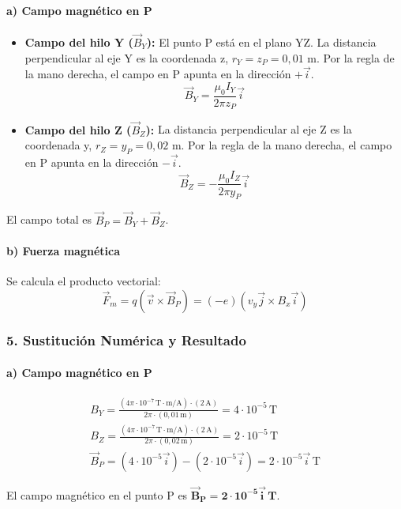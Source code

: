 \paragraph*{a) Campo magnético en P}
\begin{itemize}
    \item \textbf{Campo del hilo Y ($\vec{B}_Y$):} El punto P está en el plano YZ. La distancia perpendicular al eje Y es la coordenada z, $r_Y = z_P = 0,01$ m. Por la regla de la mano derecha, el campo en P apunta en la dirección $+\vec{i}$.
    $$ \vec{B}_Y = \frac{\mu_0 I_Y}{2\pi z_P} \vec{i} $$
    \item \textbf{Campo del hilo Z ($\vec{B}_Z$):} La distancia perpendicular al eje Z es la coordenada y, $r_Z = y_P = 0,02$ m. Por la regla de la mano derecha, el campo en P apunta en la dirección $-\vec{i}$.
    $$ \vec{B}_Z = -\frac{\mu_0 I_Z}{2\pi y_P} \vec{i} $$
\end{itemize}
El campo total es $\vec{B}_P = \vec{B}_Y + \vec{B}_Z$.
\paragraph*{b) Fuerza magnética}
Se calcula el producto vectorial:
$$ \vec{F}_m = q (\vec{v} \times \vec{B}_P) = (-e) (v_y \vec{j} \times B_x \vec{i}) $$

\subsubsection*{5. Sustitución Numérica y Resultado}
\paragraph*{a) Campo magnético en P}
\begin{gather}
    B_Y = \frac{(4\pi \cdot 10^{-7} \, \text{T}\cdot\text{m/A}) \cdot (2 \, \text{A})}{2\pi \cdot (0,01 \, \text{m})} = 4 \cdot 10^{-5} \, \text{T} \\
    B_Z = \frac{(4\pi \cdot 10^{-7} \, \text{T}\cdot\text{m/A}) \cdot (2 \, \text{A})}{2\pi \cdot (0,02 \, \text{m})} = 2 \cdot 10^{-5} \, \text{T} \\
    \vec{B}_P = (4 \cdot 10^{-5} \vec{i}) - (2 \cdot 10^{-5} \vec{i}) = 2 \cdot 10^{-5} \vec{i} \, \text{T}
\end{gather}
\begin{cajaresultado}
    El campo magnético en el punto P es $\boldsymbol{\vec{B}_P = 2 \cdot 10^{-5} \vec{i} \, \textbf{T}}$.
\end{cajaresultado}

